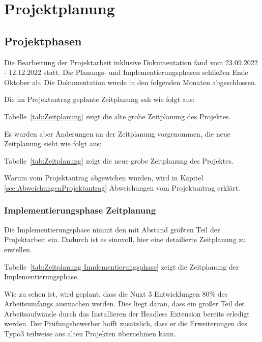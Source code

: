 \section{Projektplanung} 
\label{sec:Projektplanung}


\subsection{Projektphasen}
\label{sec:Projektphasen}

Die Bearbeitung der Projektarbeit inklusive Dokumentation fand vom 23.09.2022 - 12.12.2022 statt. Die Planungs- und Implementierungsphasen schließen Ende Oktober ab. Die Dokumentation wurde in den folgenden Monaten abgeschlossen.

Die im Projektantrag geplante Zeitplanung sah wie folgt aus:

Tabelle~\ref{tab:Zeitplanung} zeigt die alte grobe Zeitplanung des Projektes.

Es wurden aber Änderungen an der Zeitplanung vorgenommen, die neue Zeitplanung sieht wie folgt aus:

Tabelle~\ref{tab:Zeitplanung} zeigt die neue grobe Zeitplanung des Projektes.

Warum vom Projektantrag abgewichen wurden, wird in Kapitel \ref{sec:AbweichungenProjektantrag} Abweichungen vom Projektantrag erklärt.

\subsubsection{Implementierungsphase Zeitplanung}
\label{sec:Implementierungsphase Zeitplanung}

Die Implementierungsphase nimmt den mit Abstand größten Teil der Projektarbeit ein. Dadurch ist es sinnvoll, hier eine detailierte Zeitplanung zu erstellen.

Tabelle~\ref{tab:Zeitplanung Implementierungsphase} zeigt die Zeitplanung der Implementierungsphase.

Wie zu sehen ist, wird geplant, dass die Nuxt 3 Entwicklungen 80\% des Arbeitsumfangs ausmachen werden. Dies liegt daran, dass ein großer Teil der Arbeitsaufwände durch das Installieren der Headless Extension bereits erledigt werden. Der Prüfungsbewerber hofft zusätzlich, dass er die Erweiterungen des Typo3 teilweise aus alten Projekten übernehmen kann. 

